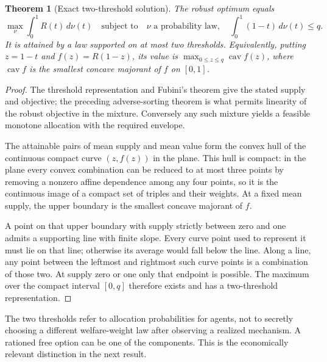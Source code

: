 \documentclass[11pt]{article}
\newtheorem{theorem}{Theorem}
\theoremstyle{remark}\newtheorem{remark}[theorem]{Remark}
\begin{document}
\begin{theorem}[Exact two-threshold solution]
The robust optimum equals
\[
 \max_{\nu}\int_0^1 R(t)\,d\nu(t)
 \quad\text{subject to}\quad
 \nu\text{ a probability law},\quad \int_0^1(1-t)\,d\nu(t)\le q.
\]
It is attained by a law supported on at most two thresholds. Equivalently, putting $z=1-t$ and $f(z)=R(1-z)$, its value is
$\max_{0\le z\le q}\operatorname{cav}f(z)$, where $\operatorname{cav}f$ is the smallest concave majorant of $f$ on $[0,1]$.
\end{theorem}
\begin{proof}
The threshold representation and Fubini's theorem give the stated supply and objective; the preceding adverse-sorting theorem is what permits linearity of the robust objective in the mixture. Conversely any such mixture yields a feasible monotone allocation with the required envelope.

The attainable pairs of mean supply and mean value form the convex hull of the continuous compact curve $(z,f(z))$ in the plane. This hull is compact: in the plane every convex combination can be reduced to at most three points by removing a nonzero affine dependence among any four points, so it is the continuous image of a compact set of triples and their weights. At a fixed mean supply, the upper boundary is the smallest concave majorant of $f$.

A point on that upper boundary with supply strictly between zero and one admits a supporting line with finite slope. Every curve point used to represent it must lie on that line; otherwise its average would fall below the line. Along a line, any point between the leftmost and rightmost such curve points is a combination of those two. At supply zero or one only that endpoint is possible. The maximum over the compact interval $[0,q]$ therefore exists and has a two-threshold representation.
\end{proof}

The two thresholds refer to allocation probabilities for agents, not to secretly choosing a different welfare-weight law after observing a realized mechanism. A rationed free option can be one of the components. This is the economically relevant distinction in the next result.
\end{document}
